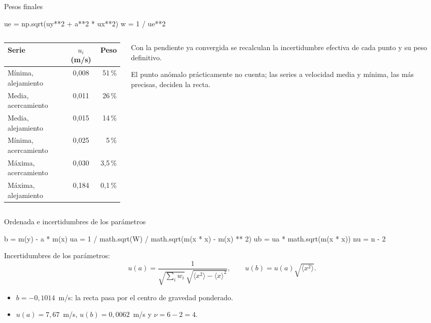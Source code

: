 \documentclass[10pt]{beamer}
\newcommand{\resalta}[1]{\textcolor{structure.fg!75!white}{#1}}
\begin{document}
\begin{frame}[fragile]{Pesos finales}
  \begin{codigo}
ue = np.sqrt(uy**2 + a**2 * ux**2)
w = 1 / ue**2
  \end{codigo}
  \begin{columns}[T]
  \begin{column}{0.58\textwidth}
  \centering\small
  \begin{tabular}{@{}lcr@{}}
    \toprule
    Serie & $u_i$ (m/s) & Peso\\
    \midrule
    Mínima, alejamiento & 0,008 & 51\,\%\\
    Media, acercamiento & 0,011 & 26\,\%\\
    Media, alejamiento & 0,015 & 14\,\%\\
    Mínima, acercamiento & 0,025 & 5\,\%\\
    Máxima, acercamiento & 0,030 & 3,5\,\%\\
    Máxima, alejamiento & 0,184 & \resalta{0,1\,\%}\\
    \bottomrule
  \end{tabular}
  \end{column}
  \begin{column}{0.38\textwidth}
  \small Con la pendiente ya convergida se recalculan la incertidumbre efectiva
  de cada punto y su peso definitivo.
  \begin{block}{}
    \small El punto anómalo prácticamente no cuenta; las series a velocidad media
    y mínima, las más precisas, deciden la recta.
  \end{block}
  \end{column}
  \end{columns}
\end{frame}

\begin{frame}[fragile]{Ordenada e incertidumbres de los parámetros}
  \begin{codigo}[listing options={style=python, basicstyle=\ttfamily\scriptsize\color{codtexto}}]
b = m(y) - a * m(x)
ua = 1 / math.sqrt(W) / math.sqrt(m(x * x) - m(x) ** 2)
ub = ua * math.sqrt(m(x * x))
nu = n - 2
  \end{codigo}
  \begin{block}{}
    \resalta{Incertidumbres de los parámetros:}
    \begin{equation}
      u(a)=\frac{1}{\sqrt{\sum_i w_i}\,\sqrt{\langle x^{2}\rangle-\langle x\rangle^{2}}},
      \qquad
      u(b)=u(a)\sqrt{\langle x^{2}\rangle}.
    \end{equation}
  \end{block}
  \small
  \begin{itemize}
    \item $b=-0{,}1014$~m/s: la recta pasa por el centro de gravedad ponderado.
    \item $u(a)=7{,}67$~m/s, $u(b)=0{,}0062$~m/s y $\nu=6-2=4$.
  \end{itemize}
\end{frame}
\end{document}
